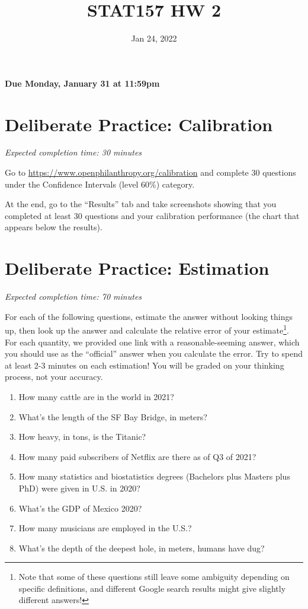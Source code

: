 \documentclass[11pt]{article}
\title{STAT157 HW 2}
\date{Jan 24, 2022}
\begin{document}
\maketitle

\hfill \textbf{Due Monday, January 31 at 11:59pm}

\section*{Deliberate Practice: Calibration}

\emph{Expected completion time: 30 minutes}

Go to \url{https://www.openphilanthropy.org/calibration} and complete 30 questions under the Confidence Intervals (level 60\%) category.

At the end, go to the ``Results'' tab and take screenshots showing that 
you completed at least 30 questions and your calibration 
performance (the chart that appears below the results).

\section*{Deliberate Practice: Estimation}

\emph{Expected completion time: 70 minutes}


For each of the following questions, estimate the answer without looking things up, then look up the answer and calculate the relative error of your estimate\footnote{Note that some of these questions still leave some ambiguity depending on specific definitions, and different Google search results might give slightly different answers!}. For each quantity, we provided one link with a reasonable-seeming answer, which you should use as the ``official'' answer when you calculate the error. Try to spend at least 2-3 minutes on each estimation! You will be graded on your thinking process, not your accuracy.

\begin{enumerate}
	\item How many cattle are in the world in 2021? 
	\item What's the length of the SF Bay Bridge, in meters? 
	\item How heavy, in tons, is the Titanic? 
	\item How many paid subscribers of Netflix are there as of Q3 of 2021?
	\item How many statistics and biostatistics degrees (Bachelors plus Masters plus PhD) were given in U.S. in 2020? 
	\item What's the GDP of Mexico 2020? 
	\item How many musicians are employed in the U.S.?
	\item What's the depth of the deepest hole, in meters, humans have dug? 
\end{enumerate}
\end{document}
